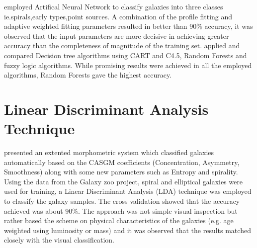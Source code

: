 \documentclass[a4paper,12pt]{report}
\begin{document}
\hspace*{0.5 in}\cite{Banerji_2010} employed Artifical Neural Network to classify  galaxies into three classes ie.spirals,early types,point sources. A combination of the profile fitting and adaptive weighted fitting parameters resulted in better than 90\% accuracy, it was observed that the input parameters are more decisive in achieving greater accuracy than the completeness of magnitude of the training set. \cite{Gauci2010} applied and compared Decision tree algorithms using CART and C4.5, Random Forests and fuzzy logic algorithms. While promising results were achieved in all the employed algorithms, Random Forests gave the highest accuracy.

\section{Linear Discriminant Analysis Technique}
\hspace*{0.5 in}\cite{Ferrari_2015} presented an extented morphometric system which classified galaxies automatically based on the CASGM coefficients (Concentration, Asymmetry, Smoothness) along with some new parameters such as Entropy and spirality. Using the data from the Galaxy zoo project, spiral and elliptical galaxies were used for training, a Linear Discriminant Analysis (LDA) technique was employed to classify the galaxy samples. The cross validation showed that the accuracy achieved was about 90\%. The approach was not simple visual inspection but rather based the scheme on physical characteristics of the galaxies (e.g. age weighted using luminosity or mass) and it was observed that the results matched closely with the visual classification. 
\end{document}
